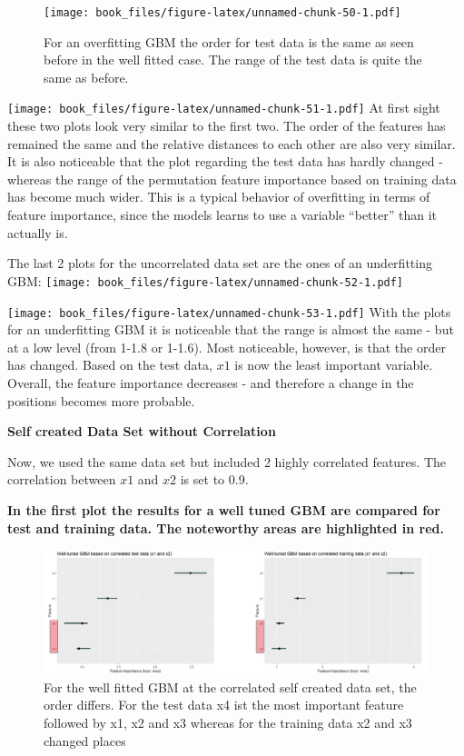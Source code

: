 \documentclass[
]{krantz}
\begin{document}
\begin{figure}
\centering
\texttt{[image: book\_files/figure-latex/unnamed-chunk-50-1.pdf]}
\caption{\label{fig:unnamed-chunk-50}For an overfitting GBM the order for test data is the same as seen before in the well fitted case. The range of the test data is quite the same as before.}
\end{figure}

\texttt{[image: book\_files/figure-latex/unnamed-chunk-51-1.pdf]}
At first sight these two plots look very similar to the first two. The order of the features has remained the same and the relative distances to each other are also very similar. It is also noticeable that the plot regarding the test data has hardly changed - whereas the range of the permutation feature importance based on training data has become much wider. This is a typical behavior of overfitting in terms of feature importance, since the models learns to use a variable ``better'' than it actually is.

The last 2 plots for the uncorrelated data set are the ones of an underfitting GBM:
\texttt{[image: book\_files/figure-latex/unnamed-chunk-52-1.pdf]}

\texttt{[image: book\_files/figure-latex/unnamed-chunk-53-1.pdf]}
With the plots for an underfitting GBM it is noticeable that the range is almost the same - but at a low level (from 1-1.8 or 1-1.6). Most noticeable, however, is that the order has changed. Based on the test data, \(x1\) is now the least important variable. Overall, the feature importance decreases - and therefore a change in the positions becomes more probable.

\textbf{Self created Data Set without Correlation}

Now, we used the same data set but included 2 highly correlated features. The correlation between \(x1\) and \(x2\) is set to 0.9.

\textbf{In the first plot the results for a well tuned GBM are compared for test and training data. The noteworthy areas are highlighted in red.}

\begin{figure}
\includegraphics[width=40.4in]{images/correlated_well} \caption{For the well fitted GBM at the correlated self created data set, the order differs. For the test data x4 ist the most important feature followed by x1, x2 and x3 whereas for the training data x2 and x3 changed places}\label{fig:unnamed-chunk-54}
\end{figure}
\end{document}
